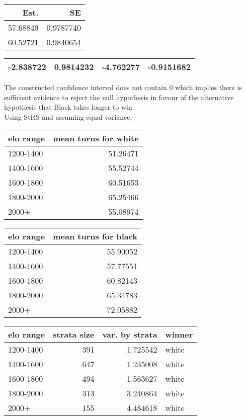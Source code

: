 \documentclass[11pt,]{article}
\begin{document}
\begin{tabular}{r|r}
\hline
Est. & SE\\
\hline
57.68849 & 0.9787740\\
\hline
60.52721 & 0.9840654\\
\hline
\end{tabular}

\begin{tabular}{r|r|r|r}
\hline
-2.838722 & 0.9814232 & -4.762277 & -0.9151682\\
\hline
\end{tabular}

The constructed confidence interval does not contain 0 which implies
there is sufficient evidence to reject the null hypothesis in favour of
the alternative hypothesis that Black takes longer to win.\\
\newline Using StRS and assuming equal variance,

\begin{tabular}{l|r}
\hline
elo range & mean turns for white\\
\hline
1200-1400 & 51.26471\\
\hline
1400-1600 & 55.52744\\
\hline
1600-1800 & 60.51653\\
\hline
1800-2000 & 65.25466\\
\hline
2000+ & 55.08974\\
\hline
\end{tabular}

\begin{tabular}{l|r}
\hline
elo range & mean turns for black\\
\hline
1200-1400 & 55.90052\\
\hline
1400-1600 & 57.77551\\
\hline
1600-1800 & 60.82143\\
\hline
1800-2000 & 65.34783\\
\hline
2000+ & 72.05882\\
\hline
\end{tabular}

\begin{tabular}{l|r|r|l}
\hline
elo range & strata size & var. by strata & winner\\
\hline
1200-1400 & 391 & 1.725542 & white\\
\hline
1400-1600 & 647 & 1.235008 & white\\
\hline
1600-1800 & 494 & 1.563627 & white\\
\hline
1800-2000 & 313 & 3.240864 & white\\
\hline
2000+ & 155 & 4.484618 & white\\
\hline
\end{tabular}
\end{document}
